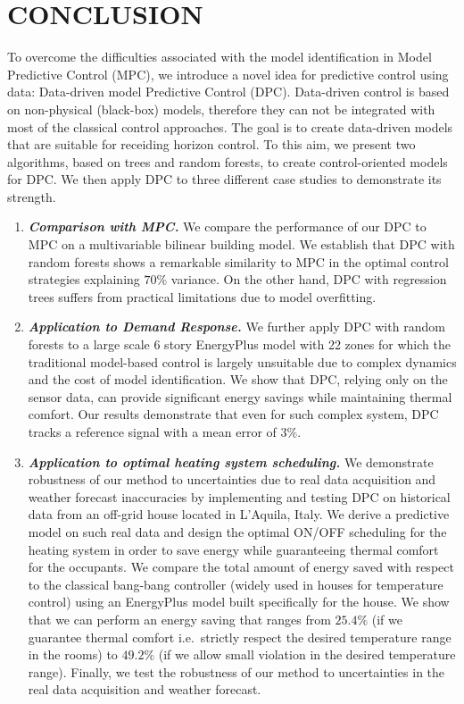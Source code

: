 \section{CONCLUSION}
\label{S:conclusion}

To overcome the difficulties associated with the model identification in Model Predictive Control (MPC), we introduce a novel idea for predictive control using data: Data-driven model Predictive Control (DPC). \textcolor[rgb]{0,0,1}{Data-driven control is based on non-physical (black-box) models, therefore they can not be integrated with most of the classical control approaches.} The goal is to create data-driven models that are suitable for receiding horizon control. \textcolor[rgb]{0,0,1}{To this aim, we present two algorithms, based on trees and random forests, to create control-oriented models for DPC. We then apply DPC to three different case studies to demonstrate its strength.}
\begin{enumerate}
\item \emph{\textbf{Comparison with MPC.}} We compare the performance of our DPC to MPC on a multivariable bilinear building model. We establish that DPC with random forests shows a remarkable similarity to MPC in the optimal control strategies explaining $70\%$ variance. On the other hand, DPC with regression trees suffers from practical limitations due to model overfitting.
\item \emph{\textbf{Application to Demand Response.}} We further apply DPC with random forests to a large scale 6 story EnergyPlus model with 22 zones for which the traditional model-based control is largely unsuitable due to complex dynamics and the cost of model identification. We show that DPC, relying only on the sensor data, can provide significant energy savings while maintaining thermal comfort. Our results demonstrate that even for such complex system, DPC tracks a reference signal with a mean error of $3\%$.
\item \textcolor[rgb]{0,0,1}{\emph{\textbf{Application to optimal heating system scheduling.}} We demonstrate robustness of our method to uncertainties due to real data acquisition and weather forecast inaccuracies by implementing and testing DPC on historical data from an off-grid house located in L'Aquila, Italy. We derive a predictive model on such real data and design the optimal ON/OFF scheduling for the heating system in order to save energy while guaranteeing thermal comfort for the occupants. We compare the total amount of energy saved with respect to the classical bang-bang controller (widely used in houses for temperature control) using an EnergyPlus model built specifically for the house. We show that we can perform an energy saving that ranges from $25.4\%$ (if we guarantee thermal comfort i.e.~strictly respect the desired temperature range in the rooms) to $49.2\%$ (if we allow small violation in the desired temperature range). Finally, we test the robustness of our method to uncertainties in the real data acquisition and weather forecast.}
\end{enumerate}

